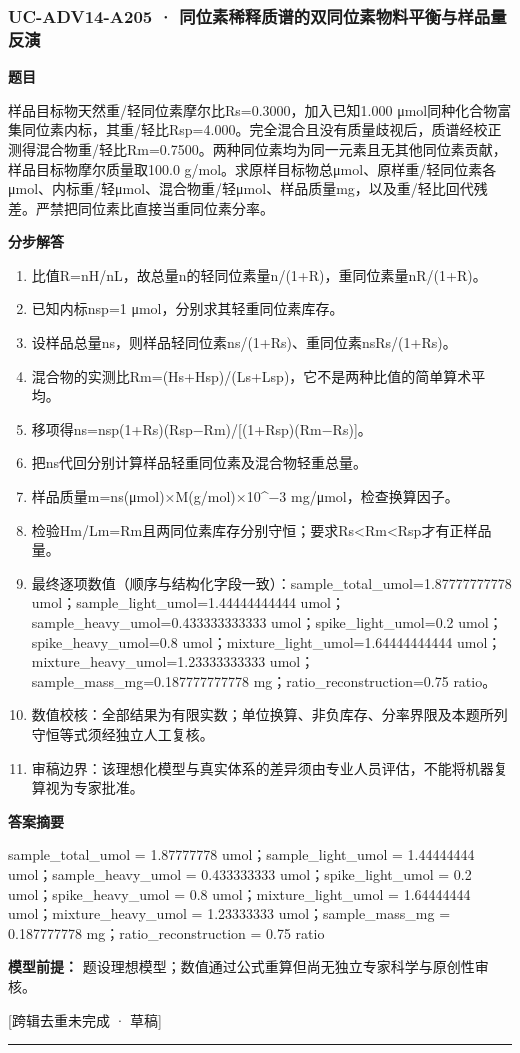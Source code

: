 \documentclass[UTF8,11pt,a4paper]{ctexart}
\begin{document}
\subsubsection*{UC-ADV14-A205 · 同位素稀释质谱的双同位素物料平衡与样品量反演}
\noindent\textbf{题目}\par
样品目标物天然重/轻同位素摩尔比Rs=0.3000，加入已知1.000 μmol同种化合物富集同位素内标，其重/轻比Rsp=4.000。完全混合且没有质量歧视后，质谱经校正测得混合物重/轻比Rm=0.7500。两种同位素均为同一元素且无其他同位素贡献，样品目标物摩尔质量取100.0 g/mol。求原样目标物总μmol、原样重/轻同位素各μmol、内标重/轻μmol、混合物重/轻μmol、样品质量mg，以及重/轻比回代残差。严禁把同位素比直接当重同位素分率。\par
\medskip\noindent\textbf{分步解答}
\begin{enumerate}
\item 比值R=nH/nL，故总量n的轻同位素量n/(1+R)，重同位素量nR/(1+R)。
\item 已知内标nsp=1 μmol，分别求其轻重同位素库存。
\item 设样品总量ns，则样品轻同位素ns/(1+Rs)、重同位素nsRs/(1+Rs)。
\item 混合物的实测比Rm=(Hs+Hsp)/(Ls+Lsp)，它不是两种比值的简单算术平均。
\item 移项得ns=nsp(1+Rs)(Rsp−Rm)/[(1+Rsp)(Rm−Rs)]。
\item 把ns代回分别计算样品轻重同位素及混合物轻重总量。
\item 样品质量m=ns(μmol)×M(g/mol)×10\textasciicircum{}−3 mg/μmol，检查换算因子。
\item 检验Hm/Lm=Rm且两同位素库存分别守恒；要求Rs<Rm<Rsp才有正样品量。
\item 最终逐项数值（顺序与结构化字段一致）：sample\_total\_umol=1.87777777778 umol；sample\_light\_umol=1.44444444444 umol；sample\_heavy\_umol=0.433333333333 umol；spike\_light\_umol=0.2 umol；spike\_heavy\_umol=0.8 umol；mixture\_light\_umol=1.64444444444 umol；mixture\_heavy\_umol=1.23333333333 umol；sample\_mass\_mg=0.187777777778 mg；ratio\_reconstruction=0.75 ratio。
\item 数值校核：全部结果为有限实数；单位换算、非负库存、分率界限及本题所列守恒等式须经独立人工复核。
\item 审稿边界：该理想化模型与真实体系的差异须由专业人员评估，不能将机器复算视为专家批准。
\end{enumerate}
\noindent\textbf{答案摘要}\par
sample\_total\_umol = 1.87777778 umol；sample\_light\_umol = 1.44444444 umol；sample\_heavy\_umol = 0.433333333 umol；spike\_light\_umol = 0.2 umol；spike\_heavy\_umol = 0.8 umol；mixture\_light\_umol = 1.64444444 umol；mixture\_heavy\_umol = 1.23333333 umol；sample\_mass\_mg = 0.187777778 mg；ratio\_reconstruction = 0.75 ratio\par
\noindent\textbf{模型前提：}
题设理想模型；数值通过公式重算但尚无独立专家科学与原创性审核。\par
\noindent\textcolor{red!65!black}{[跨辑去重未完成 · 草稿]} \par
\medskip\hrule\medskip
{}
\end{document}
